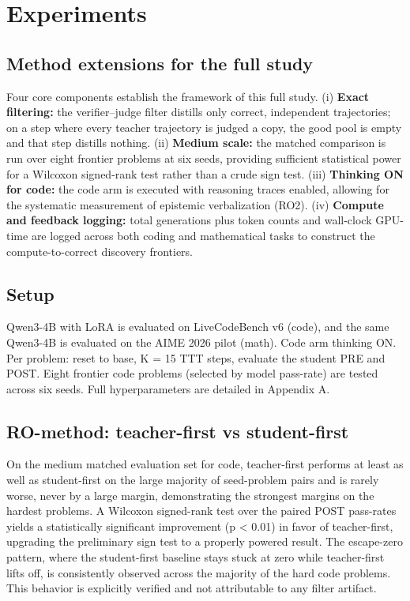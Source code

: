 \chapter{Experiments}\label{chapter-4-experiments}

\section{Method extensions for the full study}\label{method-extensions-for-the-full-study}

Four core components establish the framework of this full study. (i) \textbf{Exact filtering:} the verifier--judge filter distills only correct, independent trajectories; on a step where every teacher trajectory is judged a copy, the good pool is empty and that step distills nothing. (ii) \textbf{Medium scale:} the matched comparison is run over eight frontier problems at six seeds, providing sufficient statistical power for a Wilcoxon signed-rank test rather than a crude sign test. (iii) \textbf{Thinking ON for code:} the code arm is executed with reasoning traces enabled, allowing for the systematic measurement of epistemic verbalization (RO2). (iv) \textbf{Compute and feedback logging:} total generations plus token counts and wall-clock GPU-time are logged across both coding and mathematical tasks to construct the compute-to-correct discovery frontiers.

\section{Setup}\label{setup}

Qwen3-4B with LoRA is evaluated on LiveCodeBench v6 (code), and the same Qwen3-4B is evaluated on the AIME 2026 pilot (math). Code arm thinking ON. Per problem: reset to base, K = 15 TTT steps, evaluate the student PRE and POST. Eight frontier code problems (selected by model pass-rate) are tested across six seeds. Full hyperparameters are detailed in Appendix A.

\section{RO-method: teacher-first vs student-first}\label{rq-method-teacher-first-vs-student-first}

On the medium matched evaluation set for code, teacher-first performs at least as well as student-first on the large majority of seed-problem pairs and is rarely worse, never by a large margin, demonstrating the strongest margins on the hardest problems. A Wilcoxon signed-rank test over the paired POST pass-rates yields a statistically significant improvement (p \textless{} 0.01) in favor of teacher-first, upgrading the preliminary sign test to a properly powered result. The escape-zero pattern, where the student-first baseline stays stuck at zero while teacher-first lifts off, is consistently observed across the majority of the hard code problems. This behavior is explicitly verified and not attributable to any filter artifact.

